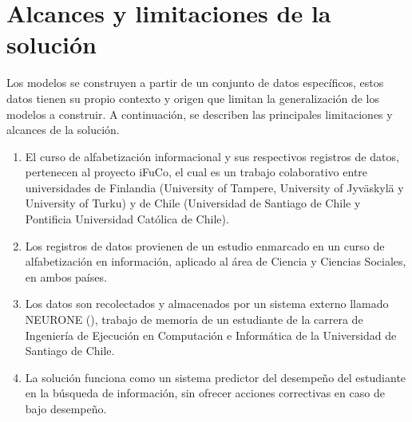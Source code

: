 \section{Alcances y limitaciones de la solución}
\label{sec:alcances}
Los modelos se construyen a partir de un conjunto de datos específicos, estos datos tienen su propio contexto y origen que limitan la generalización de los modelos a construir. A continuación, se describen las principales limitaciones y alcances de la solución.

\begin{enumerate}
	\item El curso de alfabetización informacional y sus respectivos registros de datos, pertenecen al proyecto iFuCo, el cual es un trabajo colaborativo entre universidades de Finlandia (University of Tampere, University of Jyväskylä y University of Turku) y de Chile (Universidad de Santiago de Chile y Pontificia Universidad Católica de Chile). 
	\item Los registros de datos provienen de un estudio enmarcado en un curso de alfabetización en información, aplicado al área de Ciencia y Ciencias Sociales, en ambos países.
	\item Los datos son recolectados y almacenados por un sistema externo llamado NEURONE (), trabajo de memoria de un estudiante de la carrera de Ingeniería de Ejecución en Computación e Informática de la Universidad de Santiago de Chile.
	\item La solución funciona como un sistema predictor del desempeño del estudiante en la búsqueda de información, sin ofrecer acciones correctivas en caso de bajo desempeño.
\end{enumerate}